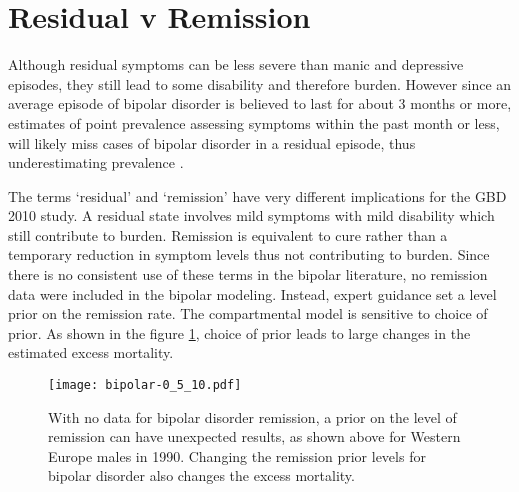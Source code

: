 \section{Residual v Remission}
Although residual symptoms can be less severe than manic and depressive episodes, they still lead to some disability and therefore burden.  However since an average episode of bipolar disorder is believed to last for about 3 months or more, estimates of point prevalence assessing symptoms within the past month or less, will likely miss cases of bipolar disorder in a residual episode, thus underestimating prevalence \cite{angst_historical_2000}.

The terms `residual' and `remission' have very different implications for the GBD 2010 study.  A residual state involves mild symptoms with mild disability which still contribute to burden. Remission is equivalent to cure rather than a temporary reduction in symptom levels thus not contributing to burden. Since there is no consistent use of these terms in the bipolar literature, no remission data were included in the bipolar modeling. Instead, expert guidance set a level prior on the remission rate.  The compartmental model is sensitive to choice of prior. As shown in the figure \ref{fig:app-bipolar remission}, choice of prior leads to large changes in the estimated excess mortality.

    \begin{figure}[h]
        \begin{center}
            \texttt{[image: bipolar-0\_5\_10.pdf]}
            \caption{With no data for bipolar disorder remission, a prior on the level of remission can have unexpected results, as shown above for Western Europe males in 1990.  Changing the remission prior levels for bipolar disorder also changes the excess mortality.}
            \label{fig:app-bipolar remission}
        \end{center}
    \end{figure}

